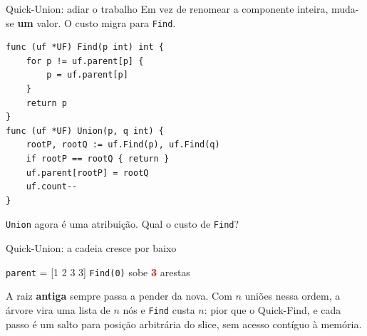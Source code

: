 \documentclass{beamer}
\newcommand{\hl}[1]{\textcolor{red}{\textbf{#1}}}
\begin{document}
\begin{frame}[fragile]{Quick-Union: adiar o trabalho}
	Em vez de renomear a componente inteira, muda-se \textbf{um} valor. O custo
	migra para \texttt{Find}.

	\begin{verbatim}
func (uf *UF) Find(p int) int {
    for p != uf.parent[p] {
        p = uf.parent[p]
    }
    return p
}
func (uf *UF) Union(p, q int) {
    rootP, rootQ := uf.Find(p), uf.Find(q)
    if rootP == rootQ { return }
    uf.parent[rootP] = rootQ
    uf.count--
}
  \end{verbatim}

	\begin{center}
		\Large \texttt{Union} agora é uma atribuição. Qual o custo de \texttt{Find}?
	\end{center}
\end{frame}

\begin{frame}{Quick-Union: a cadeia cresce por baixo}
	\begin{center}
	\end{center}

	\vspace{0.1cm}
	\begin{center}
		\texttt{parent} = [1 2 3 3] \qquad \texttt{Find(0)} sobe \hl{3} arestas
	\end{center}

	\vspace{0.2cm}
	{\footnotesize A raiz \textbf{antiga} sempre passa a pender da nova. Com $n$
		uniões nessa ordem, a árvore vira uma lista de $n$ nós e \texttt{Find}
		custa $n$: pior que o Quick-Find, e cada passo é um salto para posição
		arbitrária do slice, sem acesso contíguo à memória.}
\end{frame}
\end{document}
